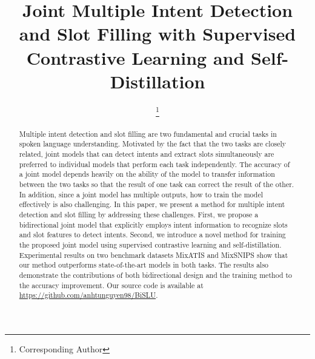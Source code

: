 \documentclass{ecai}
\begin{document}
\begin{frontmatter}

\title{Joint Multiple Intent Detection and Slot Filling with Supervised Contrastive Learning and Self-Distillation}

\author{ }
\author{ }
\author{ }
\author{ \thanks{Corresponding Author}} 

\address{Department of Computer Science,\\
Posts and Telecommunications Institute of Technology, Hanoi, Vietnam\\
\small{\{anhtunguyen446,thuuyenptit\}@gmail.com;\{phuongtm,bachnx\}@ptit.edu.vn}
}


\begin{abstract}
Multiple intent detection and slot filling are two fundamental and crucial tasks in spoken language understanding. Motivated by the fact that the two tasks are closely related, joint models that can detect intents and extract slots simultaneously are preferred to individual models that perform each task independently. The accuracy of a joint model depends heavily on the ability of the model to transfer information between the two tasks so that the result of one task can correct the result of the other. In addition, since a joint model has multiple outputs, how to train the model effectively is also challenging. In this paper, we present a method for multiple intent detection and slot filling by addressing these challenges. First, we propose a bidirectional joint model that explicitly employs intent information to recognize slots and slot features to detect intents. Second, we introduce a novel method for training the proposed joint model using supervised contrastive learning and self-distillation. Experimental results on two benchmark datasets MixATIS and MixSNIPS show that our method outperforms state-of-the-art models in both tasks. The results also demonstrate the contributions of both bidirectional design and the training method to the accuracy improvement. Our source code is available at \href{https://github.com/anhtunguyen98/BiSLU}{https://github.com/anhtunguyen98/BiSLU}.
\end{abstract}
\end{frontmatter}
\end{document}
